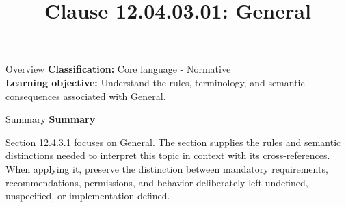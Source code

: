 \documentclass[10pt,letterpaper]{article}
\title{Clause 12.04.03.01: General}
\author{}
\date{}
\begin{document}
\maketitle
\begin{CornellOverviewBox}{Overview}
\textbf{Classification:} Core language - Normative\\[2pt]
\textbf{Learning objective:} Understand the rules, terminology, and semantic consequences associated with General.
\end{CornellOverviewBox}\begin{CornellSummaryBox}{Summary}
{\sffamily\bfseries\color{Accent} Summary}\par\vspace{3pt}Section 12.4.3.1 focuses on General. The section supplies the rules and semantic distinctions needed to interpret this topic in context with its cross-references. When applying it, preserve the distinction between mandatory requirements, recommendations, permissions, and behavior deliberately left undefined, unspecified, or implementation-defined.
\end{CornellSummaryBox}
\end{document}
